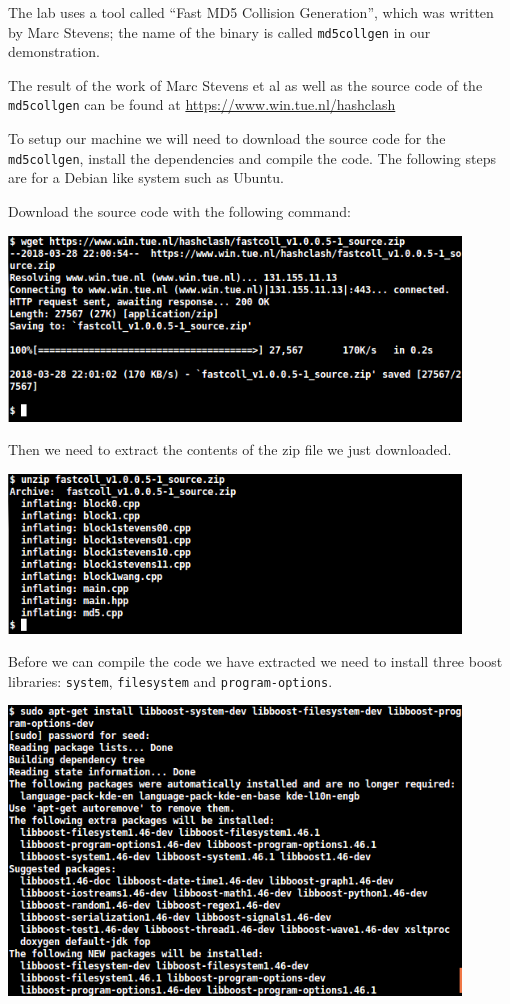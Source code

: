 \documentclass[a4paper]{article}
\begin{document}
The lab uses a tool called “Fast MD5 Collision Generation”, which was written by Marc Stevens; the name of the binary is called
\texttt{md5collgen} in our demonstration.

The result of the work of Marc Stevens et al as well as the source code of the \texttt{md5collgen} can be found at \href{https://www.win.tue.nl/hashclash}{https://www.win.tue.nl/hashclash}

To setup our machine we will need to download the source code for the \texttt{md5collgen}, install the dependencies and compile the code. The following steps are for a Debian like system such as Ubuntu.

Download the source code with the following command:

\bigskip

\includegraphics[width=0.9\textwidth]{bash/wget.png}

\bigskip

Then we need to extract the contents of the zip file we just downloaded.

\bigskip

\includegraphics[width=0.9\textwidth]{bash/unzip.png}

\bigskip

Before we can compile the code we have extracted we need to install three boost libraries: \texttt{system}, \texttt{filesystem} and \texttt{program-options}.

\bigskip

\includegraphics[width=0.9\textwidth]{bash/boost.png}
\end{document}
